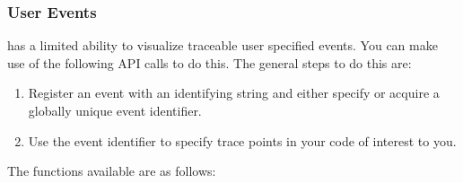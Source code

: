 \documentclass[10pt,dvips]{article}
\begin{document}
\subsubsection{User Events}

\projections{} has a limited ability to visualize traceable user
specified events. You can make use of the following API calls to do
this. The general steps to do this are:

\begin{enumerate}
\item
Register an event with an identifying string and either specify or acquire
a globally unique event identifier.

\item
Use the event identifier to specify trace points in your code of interest to you.
\end{enumerate}

The functions available are as follows:
\end{document}

